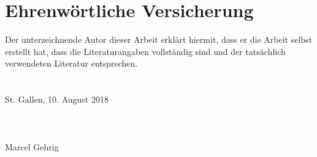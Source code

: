 \chapter{Ehrenwörtliche Versicherung}

	Der unterzeichnende Autor dieser Arbeit erklärt hiermit, dass er die Arbeit selbst erstellt hat,
	dass die Literaturangaben vollständig sind und der tatsächlich verwendeten Literatur entsprechen.\\
	\\
 	\\
	St. Gallen, 10. August 2018\\
    \\
    \\
    \\
  	Marcel Gehrig\\
